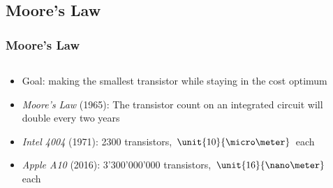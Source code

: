 \documentclass{beamer}
\begin{document}
\subsection{Moore's Law}
\begin{frame}\frametitle{Moore's Law}
\begin{columns}
\begin{column}{5cm}
\begin{itemize}
\item<1-> Goal: making the smallest transistor while staying in the cost optimum

\item<2-> \textit{Moore's Law} (1965): The transistor count on an integrated circuit will double every two years

\item<3-> \textit{Intel 4004} (1971): 2300 transistors, $\unit{10}{\micro\meter}$ each 

\item<3-> \textit{Apple A10} (2016): 3'300'000'000 transistors, $\unit{16}{\nano\meter}$ each

\end{itemize}
\end{column}
\begin{column}{7.4cm}
\begin{center}
\begin{overprint}



\end{overprint}
\end{center}
\end{column}
\end{columns}
\end{frame}
\end{document}
